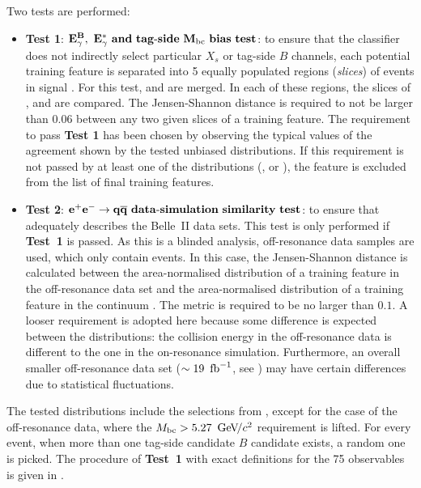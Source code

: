 Two tests are performed:
\begin{itemize}
    \item \textbf{Test 1}: $\mathbf{{E^B_{\gamma}},~{E^*_{\gamma}}~and~tag\mbox{-}side~{M_{\mathrm{bc}}}~bias~test}$:
    to ensure that the classifier does not indirectly select particular $X_s$ or tag-side $B$ channels,
    each potential training feature is separated into 5 equally populated regions (\textit{slices}) of \BtoXsgamma events in signal \MC.
    For this test, \BptoXsgamma and \BztoXsgamma are merged.
    In each of these regions, the slices of \EB, \Estar and \Mbc are compared.
    The Jensen-Shannon distance is required to not be larger than $0.06$ between any two given slices of a training feature.
    The requirement to pass \textbf{Test 1} has been chosen by observing the typical values of the agreement shown by the tested unbiased distributions.
    If this requirement is not passed by at least one of the distributions (\EB, \Estar or \Mbc), the feature is excluded from the list of final \BDT training features.
    \item \textbf{Test 2}: $\mathbf{e^+e^-\rightarrow q\overline q~data\mbox{-}simulation~similarity~test}$:
    to ensure that \MC adequately describes the Belle~II data sets.
    This test is only performed if \textbf{Test~1} is passed.
    As this is a blinded analysis, off-resonance data samples are used, which only contain \epem\ra\qqbar events.
    In this case, the Jensen-Shannon distance is calculated between 
    the area-normalised distribution of a training feature in the off-resonance data set
    and the area-normalised distribution of a training feature in the continuum \MC.
    The metric is required to be no larger than $0.1$.
    A looser requirement is adopted here because some difference is expected between the distributions:
    the collision energy in the off-resonance data is different to the one in the on-resonance simulation.
    Furthermore, an overall smaller off-resonance data set ($\sim19~\mbox{\,fb}^{-1}$, see ) may have certain differences due to statistical fluctuations.
\end{itemize}

The tested distributions include the selections from , except for the case of the off-resonance data, where the ${M_{\mathrm{bc}}}>5.27~{\mathrm{\,Ge\kern -0.1em V\!/}c^2}$ requirement is lifted.
For every event, when more than one tag-side candidate $B$ candidate exists, a random one is picked.
The procedure of \textbf{Test~1} with exact definitions for the 75 observables is given in .


